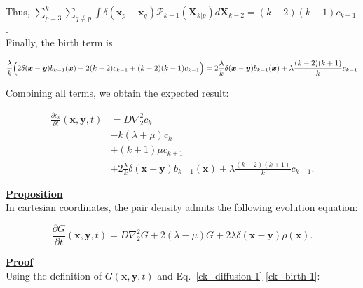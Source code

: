Thus, $\sum_{p=3}^{k}\sum_{q\neq p} \int \delta(\boldsymbol{x}_{p}-\boldsymbol{x}_{q})\mathcal{P}_{k-1}(\boldsymbol{X}_{k|p})d\boldsymbol{X}_{k-2}=(k-2)(k-1)c_{k-1}$.\\

Finally, the birth term is

\begin{equation}
\frac{\lambda}{k}\Bigl(2\delta(\boldsymbol{x}-\boldsymbol{y})b_{k-1}(\boldsymbol{x})+2(k-2)c_{k-1}+(k-2)(k-1)c_{k-1}\Bigr)=2\frac{\lambda}{k}\delta(\boldsymbol{x}-\boldsymbol{y})b_{k-1}(\boldsymbol{x})+\lambda\frac{(k-2)(k+1)}{k}c_{k-1}
\end{equation}

Combining all terms, we obtain the expected result:

\begin{subequations} 
\begin{align}
\frac{\partial c_{k}}{\partial t}(\boldsymbol{x},\boldsymbol{y},t) & =D\nabla_{2}^{2}c_{k}\label{ck_diffusion-2}\\
 & -k(\lambda+\mu)c_{k}\label{ck_same_state-2}\\
 & +(k+1)\mu c_{k+1}\label{ck_death-2}\\
 & +2\frac{\lambda}{k}\delta(\boldsymbol{x}-\boldsymbol{y})b_{k-1}(\boldsymbol{x})+\lambda\frac{(k-2)(k+1)}{k}c_{k-1}.\label{ck_birth-2}
\end{align}
\end{subequations}

\textbf{\underline{Proposition}}\\

In cartesian coordinates, the pair density admits the following evolution equation:

\begin{equation} 
\frac{\partial G}{\partial t}(\boldsymbol{x},\boldsymbol{y},t) =D\nabla_{2}^{2}G +2(\lambda-\mu)G + 2\lambda\delta(\boldsymbol{x}-\boldsymbol{y})\rho(\boldsymbol{x}).
\end{equation}

\vspace{2em}

\textbf{\underline{Proof}}\\ 

Using the definition of $G(\boldsymbol{x},\boldsymbol{y},t)$ and Eq.~\ref{ck_diffusion-1}-\ref{ck_birth-1}:

